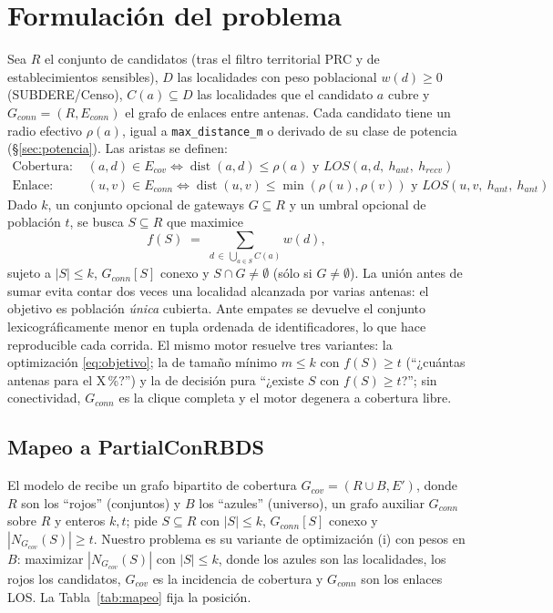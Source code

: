 \documentclass[12pt,letterpaper]{article}
\begin{document}
\section{Formulación del problema}
Sea $R$ el conjunto de candidatos (tras el filtro territorial PRC y de establecimientos sensibles), $D$ las localidades con peso poblacional $w(d) \ge 0$ (SUBDERE/Censo), $C(a) \subseteq D$ las localidades que el candidato $a$ cubre y $G_{conn} = (R, E_{conn})$ el grafo de enlaces entre antenas. Cada candidato tiene un radio efectivo $\rho(a)$, igual a \texttt{max\_distance\_m} o derivado de su clase de potencia (§\ref{sec:potencia}). Las aristas se definen:
\begin{align*}
\text{Cobertura: } & (a,d) \in E_{cov} \iff \operatorname{dist}(a,d) \le \rho(a) \text{ y } LOS(a, d,\ h_{ant},\ h_{recv}) \\
\text{Enlace: } & (u,v) \in E_{conn} \iff \operatorname{dist}(u,v) \le \min(\rho(u), \rho(v)) \text{ y } LOS(u, v,\ h_{ant},\ h_{ant})
\end{align*}
Dado $k$, un conjunto opcional de gateways $G \subseteq R$ y un umbral opcional de población $t$, se busca $S \subseteq R$ que maximice
\begin{equation}
f(S) \;=\; \sum_{d \,\in\, \bigcup_{a \in S} C(a)} w(d),
\label{eq:objetivo}
\end{equation}
sujeto a $|S| \le k$, $G_{conn}[S]$ conexo y $S \cap G \neq \emptyset$ (sólo si $G \neq \emptyset$). La unión antes de sumar evita contar dos veces una localidad alcanzada por varias antenas: el objetivo es población \emph{única} cubierta. Ante empates se devuelve el conjunto lexicográficamente menor en tupla ordenada de identificadores, lo que hace reproducible cada corrida. El mismo motor resuelve tres variantes: la optimización \eqref{eq:objetivo}; la de tamaño mínimo $m \le k$ con $f(S) \ge t$ (``¿cuántas antenas para el X\,\%?'') y la de decisión pura ``¿existe $S$ con $f(S) \ge t$?''; sin conectividad, $G_{conn}$ es la clique completa y el motor degenera a cobertura libre.

\subsection{Mapeo a PartialConRBDS}
El modelo de \cite{itcs2026} recibe un grafo bipartito de cobertura $G_{cov} = (R \cup B, E')$, donde $R$ son los ``rojos'' (conjuntos) y $B$ los ``azules'' (universo), un grafo auxiliar $G_{conn}$ sobre $R$ y enteros $k, t$; pide $S \subseteq R$ con $|S| \le k$, $G_{conn}[S]$ conexo y $|N_{G_{cov}}(S)| \ge t$. Nuestro problema es su variante de optimización (i) con pesos en $B$: maximizar $|N_{G_{cov}}(S)|$ con $|S| \le k$, donde los azules son las localidades, los rojos los candidatos, $G_{cov}$ es la incidencia de cobertura y $G_{conn}$ son los enlaces LOS. La Tabla~\ref{tab:mapeo} fija la posición.
\end{document}
